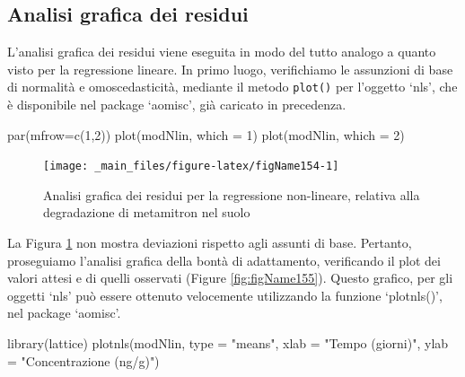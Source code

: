 \documentclass[a4paper,12pt,oneside]{book}
\newenvironment{Shaded}{\begin{snugshade}}{\end{snugshade}}
\newcommand{\DecValTok}[1]{#1}
\newcommand{\StringTok}[1]{#1}
\newcommand{\FunctionTok}[1]{#1}
\newcommand{\AttributeTok}[1]{#1}
\newcommand{\NormalTok}[1]{#1}
\begin{document}
\hypertarget{analisi-grafica-dei-residui-1}{%
\subsection{Analisi grafica dei residui}\label{analisi-grafica-dei-residui-1}}

L'analisi grafica dei residui viene eseguita in modo del tutto analogo a quanto visto per la regressione lineare. In primo luogo, verifichiamo le assunzioni di base di normalità e omoscedasticità, mediante il metodo \texttt{plot()} per l'oggetto `nls', che è disponibile nel package `aomisc', già caricato in precedenza.

\begin{Shaded}
\begin{Highlighting}[]
\FunctionTok{par}\NormalTok{(}\AttributeTok{mfrow=}\FunctionTok{c}\NormalTok{(}\DecValTok{1}\NormalTok{,}\DecValTok{2}\NormalTok{))}
\FunctionTok{plot}\NormalTok{(modNlin, }\AttributeTok{which =} \DecValTok{1}\NormalTok{)}
\FunctionTok{plot}\NormalTok{(modNlin, }\AttributeTok{which =} \DecValTok{2}\NormalTok{)}
\end{Highlighting}
\end{Shaded}

\begin{figure}

{\centering \texttt{[image: \_main\_files/figure-latex/figName154-1]} 

}

\caption{Analisi grafica dei residui per la regressione non-lineare, relativa alla degradazione di metamitron nel suolo}\label{fig:figName154}
\end{figure}

La Figura \ref{fig:figName154} non mostra deviazioni rispetto agli assunti di base. Pertanto, proseguiamo l'analisi grafica della bontà di adattamento, verificando il plot dei valori attesi e di quelli osservati (Figure \ref{fig:figName155}). Questo grafico, per gli oggetti `nls' può essere ottenuto velocemente utilizzando la funzione `plotnls()', nel package `aomisc'.

\begin{Shaded}
\begin{Highlighting}[]
\FunctionTok{library}\NormalTok{(lattice)}
\FunctionTok{plotnls}\NormalTok{(modNlin, }\AttributeTok{type =} \StringTok{"means"}\NormalTok{,}
        \AttributeTok{xlab =} \StringTok{"Tempo (giorni)"}\NormalTok{, }\AttributeTok{ylab =} \StringTok{"Concentrazione (ng/g)"}\NormalTok{)}
\end{Highlighting}
\end{Shaded}
\end{document}
